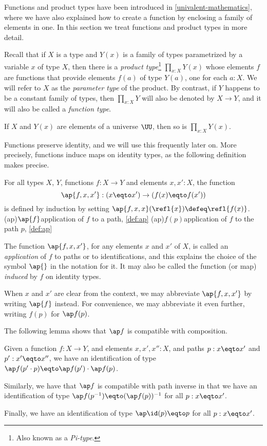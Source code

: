 Functions and product types have been introduced in \cref{univalent-mathematics}, where we have also explained how to create a function by
enclosing a family of elements in one.  In this section we treat functions and product types in more detail.

Recall that if $X$ is a type and $Y(x)$ is a family of types parametrized by a variable $x$ of type $X$, then there is a \emph{product type}\footnote{%
  Also known as a \emph{Pi-type}.}
$\prod_{x:X} Y(x)$ whose elements $f$ are functions that provide elements $f(a)$ of type $Y(a)$, one for each $a:X$.  We will refer to $X$ as the
\emph{parameter type} of the product.%
By contrast, if $Y$ happens to be a constant family of types, then
$\prod_{x:X} Y$ will also be denoted by $X \to Y$, and it will also be called a \emph{function type}.

If $X$ and $Y(x)$ are elements of a universe $\UU$, then so is $\prod_{x:X} Y(x)$.

Functions preserve identity, and we will use this frequently later on.  More precisely, functions induce maps on identity types, as the
following definition makes precise.

\begin{definition}\label{def:ap}
For all types $X$, $Y$, functions $f:X\to Y$ and elements $x,x':X$, the function
$$\ap{f,x,x'} : (x \eqto x') \to (f(x) \eqto f(x'))$$ is defined by induction by setting
$\ap{f,x,x}(\refl{x})\defeq\refl{f(x)}$.%
\glossary(ap){$\protect\ap{f}$}{application of $f$ to a path, \cref{def:ap}}
\glossary(ap){$f(p)$}{application of $f$ to the path $p$, \cref{def:ap}}
\end{definition}

The function $\ap{f,x,x'}$, for any elements $x$ and $x'$ of $X$, is called an \emph{application} of $f$ to paths or to identifications,
and this explains the choice of the symbol $\ap{}$ in the notation for it.
It may also be called the function (or map) \emph{induced} by $f$ on identity types.

When $x$ and $x'$ are clear from the context, we may abbreviate $\ap{f,x,x'}$ by writing $\ap{f}$ instead.
For convenience, we may abbreviate it even further, writing $f(p)$ for $\ap f (p)$.

The following lemma shows that $\ap f$ is compatible with composition.

\begin{construction}\label{lem:apcomp}
  Given a function $f:X\to Y$, and elements $x,x',x'':X$, and paths $p : x \eqto x'$ and $p' : x' \eqto x''$,
  we have an identification of type $\ap f (p' \cdot p) \eqto  \ap f (p') \cdot  \ap f (p)$.

  Similarly, we have that $\ap f$ is compatible with path inverse
  in that we have an identification of type
  $\ap f(p^{-1}) \eqto  (\ap f (p))^{-1}$ for all $p : x \eqto x'$.

  Finally, we have an identification of type $\ap \id (p) \eqto p$ for all
  $p : x \eqto x'$.
\end{construction}


